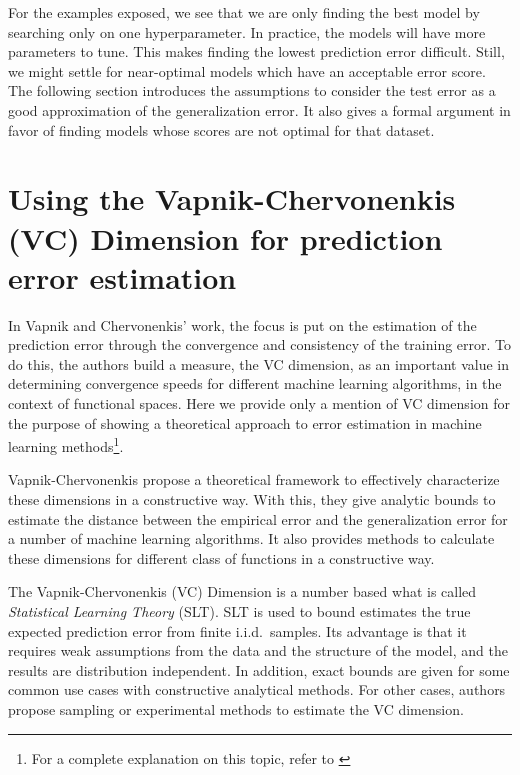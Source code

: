 For the examples exposed, we see that we are only finding the best model by searching only on one hyperparameter.
In practice, the models will have more parameters to tune.
This makes finding the lowest prediction error difficult.
Still, we might settle for near-optimal models which have an acceptable error score.
The following section introduces the assumptions to consider the test error as a good approximation of the generalization error.
It also gives a formal argument in favor of finding models whose scores are not optimal for that dataset.


\section{ Using the Vapnik-Chervonenkis (VC) Dimension for prediction error estimation}\label{section-VcDimension}

In Vapnik and Chervonenkis' work, the focus is put on the estimation of the prediction error through the convergence and consistency of the training error.
To do this, the authors build a measure, the VC dimension, as an important value in determining convergence speeds for different machine learning algorithms, in the context of functional spaces.
Here we provide only a mention of VC dimension for the purpose of showing a theoretical approach to error estimation in machine learning methods\footnote{For a complete explanation on this topic, refer to \textcite{vapnik-nature2000}}.

Vapnik-Chervonenkis propose a theoretical framework to effectively characterize these dimensions in a constructive way.
With this, they give analytic bounds to estimate the distance between the empirical error and the generalization error for a number of machine learning algorithms.
It also provides methods to calculate these dimensions for different class of functions in a constructive way.


The Vapnik-Chervonenkis (VC) Dimension is a number based what is called \textit{Statistical Learning Theory} (SLT).
SLT is used to bound estimates the true expected prediction error from finite i.i.d.\ samples.
Its advantage is that it requires weak assumptions from the data and the structure of the model, and the results are distribution independent.
In addition, exact bounds are given for some common use cases with constructive analytical methods.
For other cases, authors propose sampling or experimental methods to estimate the VC dimension.

